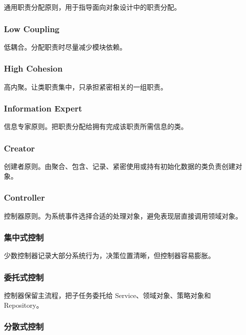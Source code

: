 \documentclass[UTF8,zihao=-4]{ctexart}
\begin{document}
通用职责分配原则，用于指导面向对象设计中的职责分配。


\subsubsection*{Low Coupling}


低耦合。分配职责时尽量减少模块依赖。


\subsubsection*{High Cohesion}


高内聚。让类职责集中，只承担紧密相关的一组职责。


\subsubsection*{Information Expert}


信息专家原则。把职责分配给拥有完成该职责所需信息的类。


\subsubsection*{Creator}


创建者原则。由聚合、包含、记录、紧密使用或持有初始化数据的类负责创建对象。


\subsubsection*{Controller}


控制器原则。为系统事件选择合适的处理对象，避免表现层直接调用领域对象。


\subsubsection*{集中式控制}


少数控制器记录大部分系统行为，决策位置清晰，但控制器容易膨胀。


\subsubsection*{委托式控制}


控制器保留主流程，把子任务委托给 Service、领域对象、策略对象和 Repository。


\subsubsection*{分散式控制}
\end{document}
